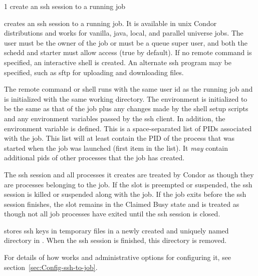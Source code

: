 \begin{ManPage}
{\label{man-condor-ssh-to-job}}{1}
{create an ssh session to a running job}
\Synopsis {}
\ToolDebugOption
{}


\Description

 creates an ssh session to a running job.  It is
available in unix Condor distributions and works for vanilla, java,
local, and parallel universe jobs.  The user must be the owner of the
job or must be a queue super user, and both the schedd and starter
must allow  access (true by default).  If no
remote command is specified, an interactive shell is created.  An
alternate ssh program may be specified, such as sftp for uploading and
downloading files.

The remote command or shell runs with the same user id as the running
job and is initialized with the same working directory.  The
environment is initialized to be the same as that of the job plus any
changes made by the shell setup scripts and any environment variables
passed by the ssh client.  In addition, the environment variable
 is defined.  This is a space-separated list
of PIDs associated with the job.  This list will at least contain the
PID of the process that was started when the job was launched (first
item in the list).  It \emph{may} contain additional pids of other
processes that the job has created.

The ssh session and all processes it creates are treated by Condor as
though they are processes belonging to the job.  If the slot is
preempted or suspended, the ssh session is killed or suspended along
with the job.  If the job exits before the ssh session finishes, the
slot remains in the Claimed Busy state and is treated as though not
all job processes have exited until the ssh session is closed.

 stores ssh keys in temporary files in a newly
created and uniquely named directory in .  When the ssh
session is finished, this directory is removed.

For details of how  works and administrative
options for configuring it, see section~\ref{sec:Config-ssh-to-job}.


\end{ManPage}
